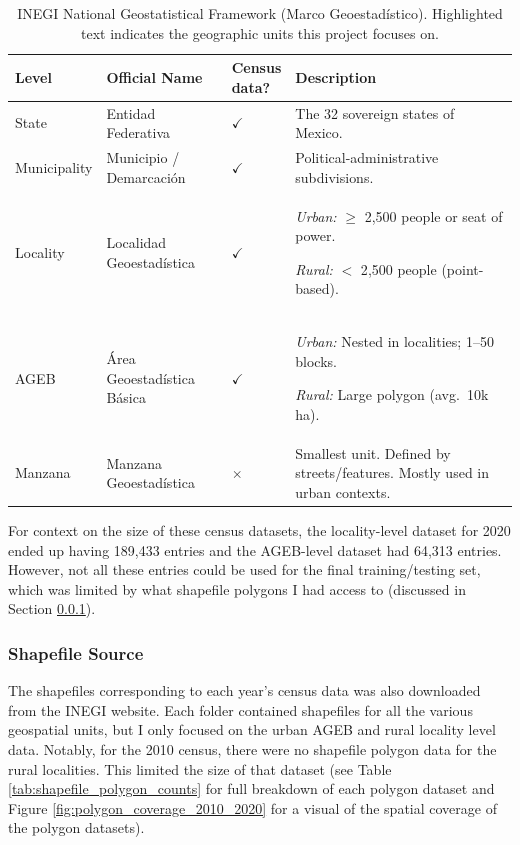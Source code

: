 \documentclass[12pt,letterpaper]{article}
\begin{document}
\begin{table}[H]
  \centering
  \caption{INEGI National Geostatistical Framework (Marco Geoestadístico). \protect\colorbox{teal!15}{Highlighted} text indicates the geographic units this project focuses on.}
  \label{tab:inegi_hierarchy}
  \renewcommand{\arraystretch}{1.15}
  \setlength{\tabcolsep}{8pt}
  \begin{tabularx}{\linewidth}{@{}
    >{\raggedright\arraybackslash}p{0.14\linewidth}
    >{\raggedright\arraybackslash}p{0.26\linewidth}
    >{\centering\arraybackslash}p{0.10\linewidth}
    >{\raggedright\arraybackslash}p{0.50\linewidth}
  @{}}
    \toprule
    \textbf{Level} & \textbf{Official Name} & \textbf{Census data?} & \textbf{Description} \\
    \midrule
    State & Entidad Federativa & $\checkmark$ & The 32 sovereign states of Mexico. \\
    Municipality & Municipio / Demarcación & $\checkmark$ & Political-administrative subdivisions. \\
    Locality & Localidad Geoestadística & $\checkmark$ & \textit{Urban:} $\ge$ 2{,}500 people or seat of power. \newline \colorbox{teal!15}{\strut\textit{Rural:} $<$ 2{,}500 people (point-based).} \\
    AGEB & Área Geoestadística Básica & $\checkmark$ & \colorbox{teal!15}{\strut\textit{Urban:} Nested in localities; 1--50 blocks.} \newline \textit{Rural:} Large polygon (avg.\ 10k ha). \\
    Manzana & Manzana Geoestadística & $\times$ & Smallest unit. Defined by streets/features. Mostly used in urban contexts. \\
    \bottomrule
  \end{tabularx}
\end{table}

For context on the size of these census datasets, the locality-level dataset for 2020 ended up having 189,433 entries and the AGEB-level dataset had 64,313 entries. However, not all these entries could be used for the final training/testing set, which was limited by what shapefile polygons I had access to (discussed in Section \ref{subsub:shpsource}).

\subsubsection{Shapefile Source}
\label{subsub:shpsource}

The shapefiles corresponding to each year's census data was also downloaded from the INEGI website. Each folder contained shapefiles for all the various geospatial units, but I only focused on the urban AGEB and rural locality level data. Notably, for the 2010 census, there were no shapefile polygon data for the rural localities. This limited the size of that dataset (see Table \ref{tab:shapefile_polygon_counts} for full breakdown of each polygon dataset and Figure \ref{fig:polygon_coverage_2010_2020} for a visual of the spatial coverage of the polygon datasets).
\end{document}
